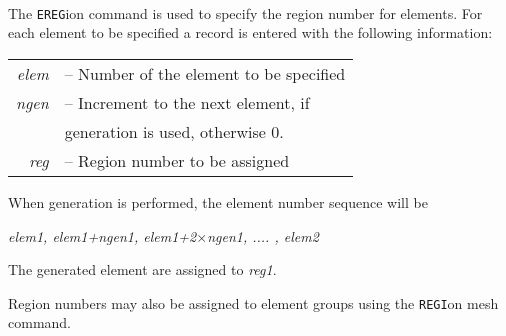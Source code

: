  \\{\smallskip}
 \\{\smallskip}
 \\{\smallskip}
\headb

The {\tt EREG}ion command is used to specify the region
number for elements.  For each element to be specified a
record is entered with the following information:

\begin{center}
\begin{tabular}{r l}
\it elem &-- Number of the element to be specified \\
\it ngen &-- Increment to the next element, if \\
         &\quad generation is used, otherwise 0. \\
\it reg  &-- Region number to be assigned \\
\end{tabular}
\end{center}
When generation is performed, the element number sequence will be

\begin{center}
{\it elem1, elem1+ngen1, elem1+2$\times$ngen1, .... , elem2}
\end{center}

The generated element are assigned to {\it reg1}.

Region numbers may also be assigned to element groups using the {\tt REGI}on
mesh command.
\vfil\eject
